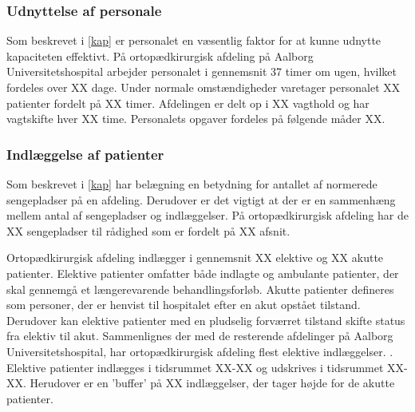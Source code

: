 \subsubsection{Udnyttelse af personale} 

Som beskrevet i \ref{kap} er personalet en væsentlig faktor for at kunne udnytte kapaciteten effektivt. På ortopædkirurgisk afdeling på Aalborg Universitetshospital arbejder personalet i gennemsnit 37 timer om ugen, hvilket fordeles over XX dage. \cite{Danske2015} Under normale omstændigheder varetager personalet XX patienter fordelt på XX timer. Afdelingen er delt op i XX vagthold og har vagtskifte hver XX time. Personalets opgaver fordeles på følgende måder XX. 

\subsubsection{Indlæggelse af patienter}

Som beskrevet i \ref{kap} har belægning en betydning for antallet af normerede sengepladser på en afdeling. Derudover er det vigtigt at der er en sammenhæng mellem antal af sengepladser og indlæggelser. På ortopædkirurgisk afdeling har de XX sengepladser til rådighed som er fordelt på XX afsnit. 

Ortopædkirurgisk afdeling indlægger i gennemsnit XX elektive og XX akutte patienter. Elektive patienter omfatter både indlagte og ambulante patienter, der skal gennemgå et længerevarende behandlingsforløb. Akutte patienter defineres som personer, der er henvist til hospitalet efter en akut opstået tilstand. Derudover kan elektive patienter med en pludselig forværret tilstand skifte status fra elektiv til akut.
Sammenlignes der med de resterende afdelinger på Aalborg Universitetshospital, har ortopædkirurgisk afdeling flest elektive indlæggelser. \cite{RegionNord2016}. Elektive patienter indlægges i tidsrummet XX-XX og udskrives i tidsrummet XX-XX. Herudover er en 'buffer' på XX indlæggelser, der tager højde for de akutte patienter. 